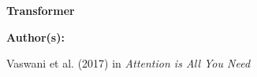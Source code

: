 
\begin{frame}{}
    \begin{center}
        \large \textbf{Transformer}
    \end{center}
    \vspace{20pt}
    
    \textbf{Author(s):}
    \begin{itemizeSpaced}{5pt}
    {\color{DimGrey} 
        \item Vaswani et al. (2017) in \emph{Attention is All You Need}
        
    }
    \end{itemizeSpaced}
\end{frame}




